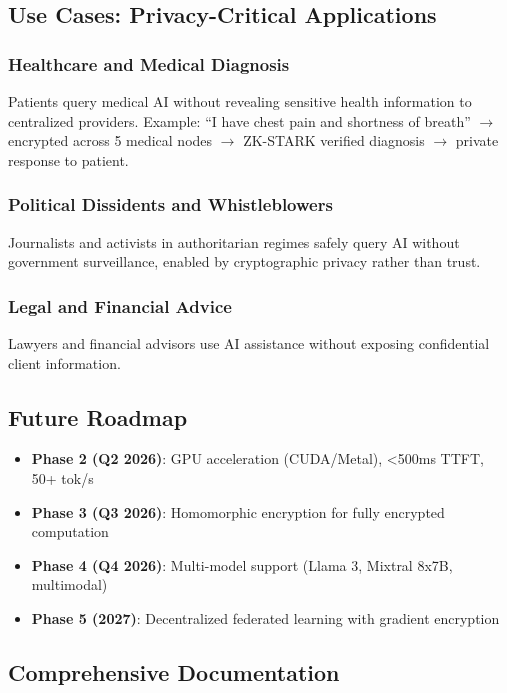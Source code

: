 \documentclass[11pt,a4paper]{article}
\begin{document}
\subsection{Use Cases: Privacy-Critical Applications}

\subsubsection{Healthcare and Medical Diagnosis}

Patients query medical AI without revealing sensitive health information to centralized providers. Example: ``I have chest pain and shortness of breath'' $\rightarrow$ encrypted across 5 medical nodes $\rightarrow$ ZK-STARK verified diagnosis $\rightarrow$ private response to patient.

\subsubsection{Political Dissidents and Whistleblowers}

Journalists and activists in authoritarian regimes safely query AI without government surveillance, enabled by cryptographic privacy rather than trust.

\subsubsection{Legal and Financial Advice}

Lawyers and financial advisors use AI assistance without exposing confidential client information.

\subsection{Future Roadmap}

\begin{itemize}
    \item \textbf{Phase 2 (Q2 2026)}: GPU acceleration (CUDA/Metal), <500ms TTFT, 50+ tok/s
    \item \textbf{Phase 3 (Q3 2026)}: Homomorphic encryption for fully encrypted computation
    \item \textbf{Phase 4 (Q4 2026)}: Multi-model support (Llama 3, Mixtral 8x7B, multimodal)
    \item \textbf{Phase 5 (2027)}: Decentralized federated learning with gradient encryption
\end{itemize}

\subsection{Comprehensive Documentation}
\end{document}
